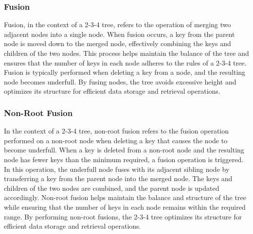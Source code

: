 \subsubsection{Fusion}

Fusion, in the context of a 2-3-4 tree, refers to the operation of merging two adjacent nodes into a single node. When fusion occurs, a key from the parent node is moved down to the merged node, effectively combining the keys and children of the two nodes. This process helps maintain the balance of the tree and ensures that the 
number of keys in each node adheres to the rules of a 2-3-4 tree. Fusion is typically performed when deleting a key from a node, and the resulting node becomes underfull. By fusing nodes, the tree avoids excessive height and optimizes its structure for efficient data storage and retrieval operations.

\subsubsection{Non-Root Fusion}

In the context of a 2-3-4 tree, non-root fusion refers to the fusion operation performed on a non-root node when deleting a key that causes the node to become underfull. When a key is deleted from a non-root node and the resulting node has fewer keys than the minimum required, a fusion operation is triggered. In this operation, 
the underfull node fuses with its adjacent sibling node by transferring a key from the parent node into the merged node. The keys and children of the two nodes are combined, and the parent node is updated accordingly. Non-root fusion helps maintain the balance and structure of the tree while ensuring that the number of keys in 
each node remains within the required range. By performing non-root fusions, the 2-3-4 tree optimizes its structure for efficient data storage and retrieval operations.

